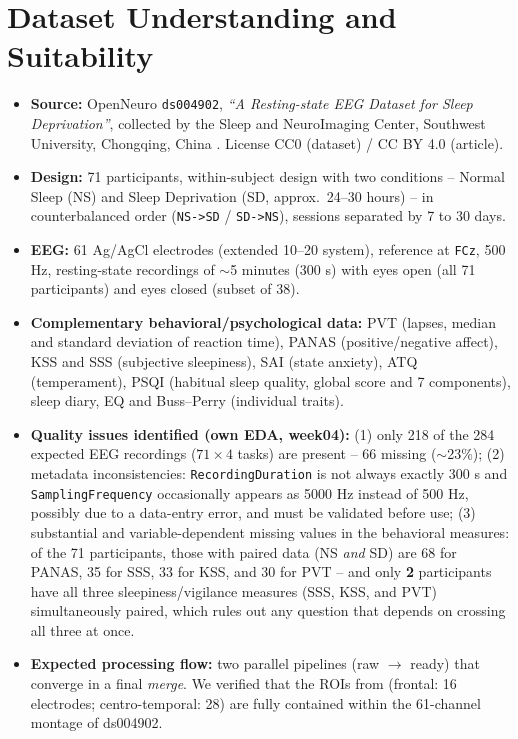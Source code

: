 \documentclass[10pt]{article}
\begin{document}
\section{Dataset Understanding and Suitability}
{\small
\begin{itemize}
    \item \textbf{Source:} OpenNeuro \texttt{ds004902}, \emph{``A Resting-state EEG Dataset for Sleep Deprivation''}, collected by the Sleep and NeuroImaging Center, Southwest University, Chongqing, China \citep{xiang2024}. License CC0 (dataset) / CC BY 4.0 (article).
    \item \textbf{Design:} 71 participants, within-subject design with two conditions -- Normal Sleep (NS) and Sleep Deprivation (SD, approx.\ 24--30 hours) -- in counterbalanced order (\texttt{NS->SD} / \texttt{SD->NS}), sessions separated by 7 to 30 days.
    \item \textbf{EEG:} 61 Ag/AgCl electrodes (extended 10--20 system), reference at \texttt{FCz}, 500 Hz, resting-state recordings of $\sim$5 minutes (300 s) with eyes open (all 71 participants) and eyes closed (subset of 38).
    \item \textbf{Complementary behavioral/psychological data:} PVT (lapses, median and standard deviation of reaction time), PANAS (positive/negative affect), KSS and SSS (subjective sleepiness), SAI (state anxiety), ATQ (temperament), PSQI (habitual sleep quality, global score and 7 components), sleep diary, EQ and Buss--Perry (individual traits).
    \item \textbf{Quality issues identified (own EDA, week04):} (1) only 218 of the 284 expected EEG recordings ($71 \times 4$ tasks) are present -- 66 missing ($\sim$23\%); (2) metadata inconsistencies: \texttt{RecordingDuration} is not always exactly 300 s and \texttt{SamplingFrequency} occasionally appears as 5000 Hz instead of 500 Hz, possibly due to a data-entry error, and must be validated before use; (3) substantial and variable-dependent missing values in the behavioral measures: of the 71 participants, those with paired data (NS \emph{and} SD) are 68 for PANAS, 35 for SSS, 33 for KSS, and 30 for PVT -- and only \textbf{2} participants have all three sleepiness/vigilance measures (SSS, KSS, and PVT) simultaneously paired, which rules out any question that depends on crossing all three at once.
    \item \textbf{Expected processing flow:} two parallel pipelines (raw $\rightarrow$ ready) that converge in a final \emph{merge}. We verified that the ROIs from \citet{cui2026} (frontal: 16 electrodes; centro-temporal: 28) are fully contained within the 61-channel montage of ds004902.

\end{itemize}}
\end{document}
